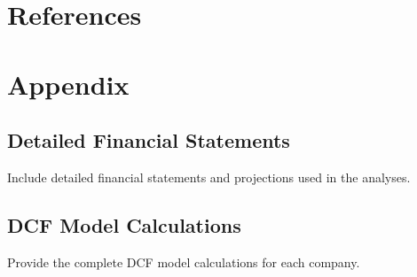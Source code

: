 \documentclass[12pt]{report}
\begin{document}
\chapter{References}



\appendix
\chapter{Appendix}
\section{Detailed Financial Statements}
Include detailed financial statements and projections used in the analyses.

\section{DCF Model Calculations}
Provide the complete DCF model calculations for each company.
\end{document}
